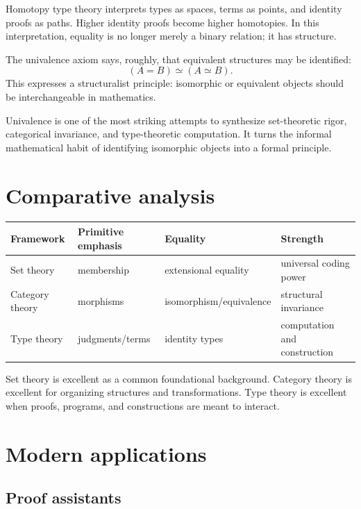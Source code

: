 Homotopy type theory interprets types as spaces, terms as points, and identity proofs as paths.  Higher identity proofs become higher homotopies.  In this interpretation, equality is no longer merely a binary relation; it has structure.

The univalence axiom says, roughly, that equivalent structures may be identified:
\[
  (A=B)\simeq(A\simeq B).
\]
This expresses a structuralist principle: isomorphic or equivalent objects should be interchangeable in mathematics.

\begin{remark}
Univalence is one of the most striking attempts to synthesize set-theoretic rigor, categorical invariance, and type-theoretic computation.  It turns the informal mathematical habit of identifying isomorphic objects into a formal principle.
\end{remark}

\section{Comparative analysis}

\begin{center}
\small
\begin{tabularx}{\textwidth}{@{}lYYY@{}}
\toprule
Framework & Primitive emphasis & Equality & Strength\\
\midrule
Set theory & membership & extensional equality & universal coding power\\
Category theory & morphisms & isomorphism\slash equivalence & structural invariance\\
Type theory & judgments/terms & identity types & computation and construction\\
\bottomrule
\end{tabularx}
\end{center}

Set theory is excellent as a common foundational background.  Category theory is excellent for organizing structures and transformations.  Type theory is excellent when proofs, programs, and constructions are meant to interact.

\section{Modern applications}

\subsection{Proof assistants}


